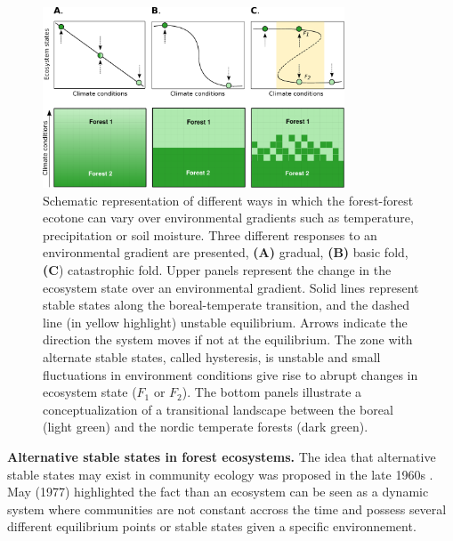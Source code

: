 \begin{figure}[t]
	\begin{center}
	\includegraphics[width=0.8\textwidth]{fig/states.pdf}
	\end{center}
	\caption{Schematic representation of different ways in which the forest-forest ecotone can vary over environmental gradients such as temperature, precipitation
	or soil moisture. Three different responses to an environmental gradient are presented,
	\textbf{(A)} gradual, \textbf{(B)} basic fold, \textbf{(C}) catastrophic fold.
	Upper panels represent the change in the ecosystem state over an environmental gradient. Solid lines represent stable states along the boreal-temperate
	transition, and the dashed line (in yellow highlight) unstable equilibrium. Arrows indicate the
	direction the system moves if not at the equilibrium. The zone with alternate stable states,
	called hysteresis, is unstable and small fluctuations in
	environment conditions give rise to abrupt changes in ecosystem state ($F_1$ or $F_2$). 
	The bottom panels illustrate a conceptualization of a transitional landscape
	between the boreal (light green) and the nordic temperate forests (dark
	green).}
	\label{fig1}
	\vspace{-1.25em}
\end{figure}


\textbf{Alternative stable states in forest ecosystems.} The idea that
alternative stable states may exist in community ecology was proposed in the
late 1960s \cite{Scheffer2001,Society2014a}. May (1977) \cite{May1977}
highlighted the fact than an ecosystem can be seen as a dynamic system where
communities are not constant accross the time and possess several different
equilibrium points or stable states given a specific environnement.



